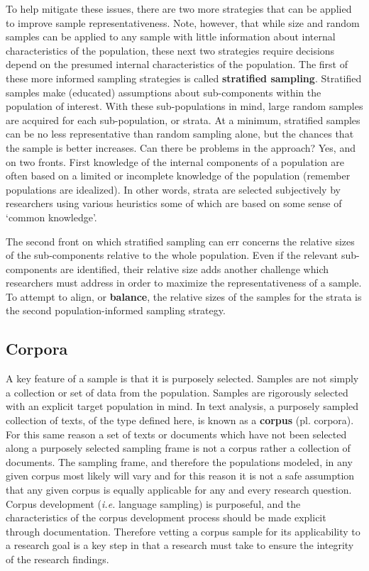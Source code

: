 \documentclass[
  letterpaper,
]{latex/krantz}
\begin{document}
To help mitigate these issues, there are two more strategies that can be
applied to improve sample representativeness. Note, however, that while
size and random samples can be applied to any sample with little
information about internal characteristics of the population, these next
two strategies require decisions depend on the presumed internal
characteristics of the population. The first of these more informed
sampling strategies is called \textbf{stratified sampling}. Stratified
samples make (educated) assumptions about sub-components within the
population of interest. With these sub-populations in mind, large random
samples are acquired for each sub-population, or strata. At a minimum,
stratified samples can be no less representative than random sampling
alone, but the chances that the sample is better increases. Can there be
problems in the approach? Yes, and on two fronts. First knowledge of the
internal components of a population are often based on a limited or
incomplete knowledge of the population (remember populations are
idealized). In other words, strata are selected subjectively by
researchers using various heuristics some of which are based on some
sense of `common knowledge'.

The second front on which stratified sampling can err concerns the
relative sizes of the sub-components relative to the whole population.
Even if the relevant sub-components are identified, their relative size
adds another challenge which researchers must address in order to
maximize the representativeness of a sample. To attempt to align, or
\textbf{balance}, the relative sizes of the samples for the strata is
the second population-informed sampling strategy.

\hypertarget{corpora}{%
\subsection{Corpora}\label{corpora}}

A key feature of a sample is that it is purposely selected. Samples are
not simply a collection or set of data from the population. Samples are
rigorously selected with an explicit target population in mind. In text
analysis, a purposely sampled collection of texts, of the type defined
here, is known as a \textbf{corpus} (pl. corpora). For this same reason
a set of texts or documents which have not been selected along a
purposely selected sampling frame is not a corpus rather a collection of
documents. The sampling frame, and therefore the populations modeled, in
any given corpus most likely will vary and for this reason it is not a
safe assumption that any given corpus is equally applicable for any and
every research question. Corpus development (\emph{i.e.} language
sampling) is purposeful, and the characteristics of the corpus
development process should be made explicit through documentation.
Therefore vetting a corpus sample for its applicability to a research
goal is a key step in that a research must take to ensure the integrity
of the research findings.
\end{document}
